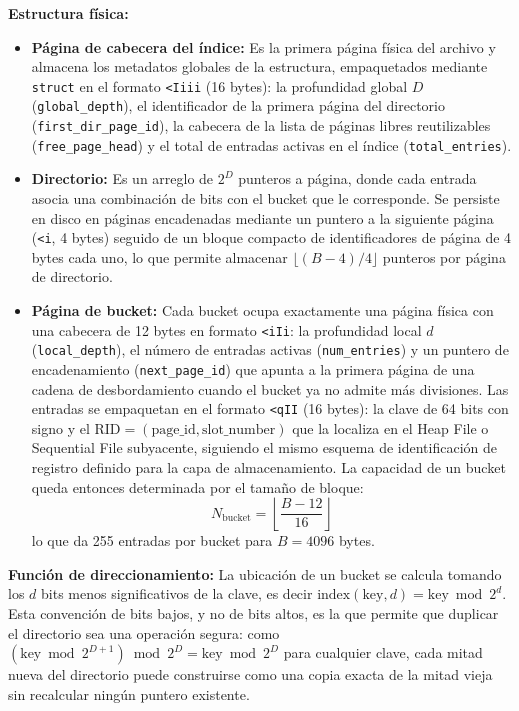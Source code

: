 \documentclass[a4paper,12pt]{article}
\begin{document}
\textbf{Estructura física:}
\begin{itemize}
    \item \textbf{Página de cabecera del índice:} Es la primera página física
    del archivo y almacena los metadatos globales de la estructura, empaquetados
    mediante \texttt{struct} en el formato \texttt{<Iiii} (16 bytes): la
    profundidad global $D$ (\texttt{global\_depth}), el identificador de la
    primera página del directorio (\texttt{first\_dir\_page\_id}), la cabecera
    de la lista de páginas libres reutilizables (\texttt{free\_page\_head}) y el
    total de entradas activas en el índice (\texttt{total\_entries}).

    \item \textbf{Directorio:} Es un arreglo de $2^D$ punteros a página, donde
    cada entrada asocia una combinación de bits con el bucket que le
    corresponde. Se persiste en disco en páginas encadenadas mediante un puntero
    a la siguiente página (\texttt{<i}, 4 bytes) seguido de un bloque compacto de
    identificadores de página de 4 bytes cada uno, lo que permite almacenar
    $\lfloor (B-4)/4 \rfloor$ punteros por página de directorio.

    \item \textbf{Página de bucket:} Cada bucket ocupa exactamente una página
    física con una cabecera de 12 bytes en formato \texttt{<iIi}: la
    profundidad local $d$ (\texttt{local\_depth}), el número de entradas activas
    (\texttt{num\_entries}) y un puntero de encadenamiento
    (\texttt{next\_page\_id}) que apunta a la primera página de una cadena de
    desbordamiento cuando el bucket ya no admite más divisiones. Las entradas se
    empaquetan en el formato \texttt{<qII} (16 bytes): la clave de 64 bits con
    signo y el $\text{RID} = (\text{page\_id}, \text{slot\_number})$ que la
    localiza en el Heap File o Sequential File subyacente, siguiendo el mismo
    esquema de identificación de registro definido para la capa de
    almacenamiento. La capacidad de un bucket queda entonces determinada por el
    tamaño de bloque:
    \begin{equation}
        N_{\text{bucket}} = \left\lfloor \frac{B - 12}{16} \right\rfloor
    \end{equation}
    lo que da 255 entradas por bucket para $B = 4096$ bytes.
\end{itemize}

\textbf{Función de direccionamiento:}
La ubicación de un bucket se calcula tomando los $d$ bits menos significativos
de la clave, es decir $\text{index}(\text{key}, d) = \text{key} \bmod 2^{d}$.
Esta convención de bits bajos, y no de bits altos, es la que permite que
duplicar el directorio sea una operación segura: como
$(\text{key} \bmod 2^{D+1}) \bmod 2^{D} = \text{key} \bmod 2^{D}$ para cualquier
clave, cada mitad nueva del directorio puede construirse como una copia exacta
de la mitad vieja sin recalcular ningún puntero existente.
\end{document}
